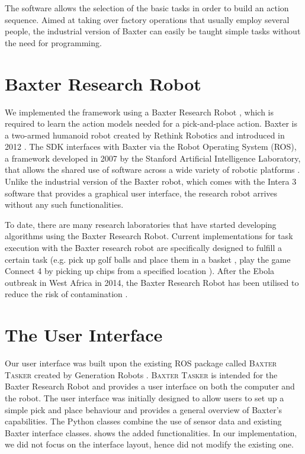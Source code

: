 The software allows the selection of the basic tasks in order to build an action sequence.
Aimed at taking over factory operations that usually employ several people, the industrial version of Baxter can easily be taught simple tasks without the need for programming.


\section{Baxter Research Robot}
We implemented the framework using a Baxter Research Robot \cite{robotics2013baxter}, which is required to learn the action models needed for a pick-and-place action.
Baxter is a two-armed humanoid robot created by Rethink Robotics and introduced in 2012 \cite{robotics2013baxter}.
The SDK interfaces with Baxter via the Robot Operating System (ROS), a framework developed in 2007 by the Stanford Artificial Intelligence Laboratory, that allows the shared use of software across a wide variety of robotic platforms \cite{fernandez2015learning}.
Unlike the industrial version of the Baxter robot, which comes with the Intera 3 software that provides a graphical user interface, the research robot arrives without any such functionalities.

To date, there are many research laboratories that have started developing algorithms using the Baxter Research Robot.
Current implementations for task execution with the Baxter research robot are specifically designed to fulfill a certain task (e.g.
pick up golf balls and place them in a basket \cite{BaxterGolf}, play the game Connect 4 by picking up chips from a specified location \cite{Connect4}).
After the Ebola outbreak in West Africa in 2014, the Baxter Research Robot has been utilised to reduce the risk of contamination \cite{Ebola}.


\section{The User Interface}
Our user interface was built upon the existing ROS package called \textsc{Baxter Tasker} created by Generation Robots \cite{BaxterTasker}.
\textsc{Baxter Tasker} is intended for the Baxter Research Robot and provides a user interface on both the computer and the robot.
The user interface was initially designed to allow users to set up a simple pick and place behaviour and provides a general overview of Baxter's capabilities.
The Python classes combine the use of sensor data and existing Baxter interface classes.
  shows the added functionalities.
In our implementation, we did not focus on the interface layout, hence did not modify the existing one.


